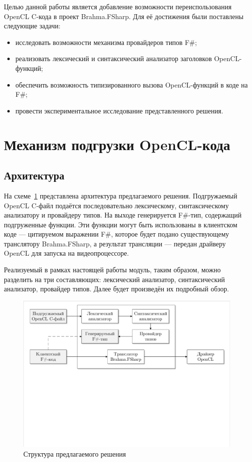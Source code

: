 \documentclass[14pt]{matmex-diploma}
\begin{document}
Целью данной работы является добавление возможности переиспользования OpenCL C-кода в проект Brahma.FSharp. Для её достижения были поставлены следующие задачи:

\begin{itemize}
    \item исследовать возможности механизма провайдеров типов F\#;
    \item реализовать лексический и синтаксический анализатор заголовков OpenCL-функций;
    \item обеспечить возможность типизированного вызова OpenCL-функций в коде на F\#;
    \item провести экспериментальное исследование представленного решения.
\end{itemize}


\section{Механизм подгрузки OpenCL-кода}

\subsection{Архитектура}
На схеме~\ref{architecture} представлена архитектура предлагаемого решения. Подгружаемый OpenCL C-файл подаётся последовательно лексическому, синтаксическому анализатору и провайдеру типов. На выходе генерируется F\#-тип, содержащий подгруженные функции. Эти функции могут быть использованы в клиентском коде --- цитируемом выражении F\#, которое будет подано существующему транслятору Brahma.FSharp, а результат трансляции --- передан драйверу OpenCL для запуска на видеопроцессоре.

Реализуемый в рамках настоящей работы модуль, таким образом, можно разделить на три составляющих: лексический анализатор, синтаксический анализатор, провайдер типов. Далее будет произведён их подробный обзор.

\begin{figure}[h]
\centering
\includegraphics[width=15cm]{courseworkpictures/architecture.pdf}
\caption{Структура предлагаемого решения}
\label{architecture}
\end{figure}
\end{document}
